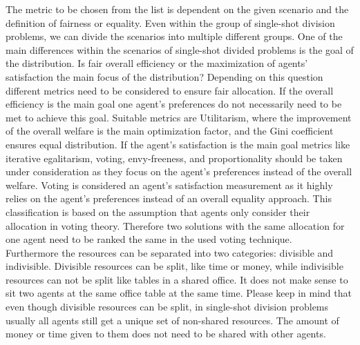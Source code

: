\documentclass[german, a4paper, 11pt, oneside]{scrbook}
\begin{document}
The metric to be chosen from the list is dependent on the given scenario and the definition of fairness or equality. Even within the group of single-shot division problems, we can divide the scenarios into multiple different groups. One of the main differences within the scenarios of single-shot divided problems is the goal of the distribution. Is fair overall efficiency or the maximization of agents' satisfaction the main focus of the distribution? Depending on this question different metrics need to be considered to ensure fair allocation. If the overall efficiency is the main goal one agent's preferences do not necessarily need to be met to achieve this goal. Suitable metrics are Utilitarism, where the improvement of the overall welfare is the main optimization factor, and the Gini coefficient ensures equal distribution. If the agent's satisfaction is the main goal metrics like iterative egalitarism, voting, envy-freeness, and proportionality should be taken under consideration as they focus on the agent's preferences instead of the overall welfare. Voting is considered an agent's satisfaction measurement as it highly relies on the agent's preferences instead of an overall equality approach. This classification is based on the assumption that agents only consider their allocation in voting theory. Therefore two solutions with the same allocation for one agent need to be ranked the same in the used voting technique.\\ Furthermore the resources can be separated into two categories: divisible and indivisible. Divisible resources can be split, like time or money, while indivisible resources can not be split like tables in a shared office. It does not make sense to sit two agents at the same office table at the same time. Please keep in mind that even though divisible resources can be split, in single-shot division problems usually all agents still get a unique set of non-shared resources. The amount of money or time given to them does not need to be shared with other agents. 
\end{document}
